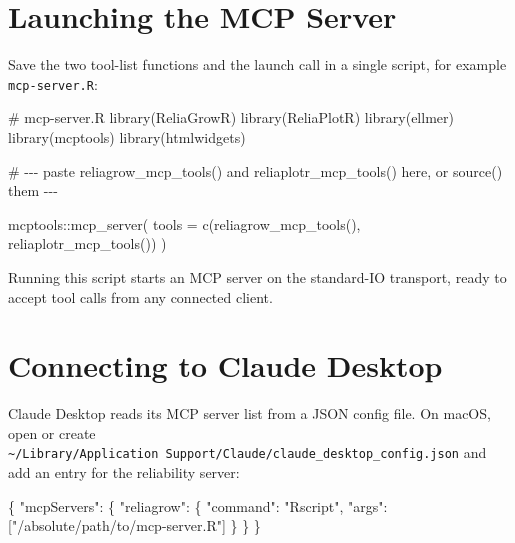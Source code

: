 \documentclass[
  letterpaper,
  DIV=11,
  numbers=noendperiod]{scrreprt}
\newenvironment{Shaded}{\begin{snugshade}}{\end{snugshade}}
\newcommand{\AttributeTok}[1]{\textcolor[rgb]{0.40,0.45,0.13}{#1}}
\newcommand{\CommentTok}[1]{\textcolor[rgb]{0.37,0.37,0.37}{#1}}
\newcommand{\DataTypeTok}[1]{\textcolor[rgb]{0.68,0.00,0.00}{#1}}
\newcommand{\FunctionTok}[1]{\textcolor[rgb]{0.28,0.35,0.67}{#1}}
\newcommand{\NormalTok}[1]{\textcolor[rgb]{0.00,0.23,0.31}{#1}}
\newcommand{\OtherTok}[1]{\textcolor[rgb]{0.00,0.23,0.31}{#1}}
\newcommand{\SpecialCharTok}[1]{\textcolor[rgb]{0.37,0.37,0.37}{#1}}
\newcommand{\StringTok}[1]{\textcolor[rgb]{0.13,0.47,0.30}{#1}}
\begin{document}
\section{Launching the MCP Server}\label{launching-the-mcp-server}

Save the two tool-list functions and the launch call in a single script,
for example \texttt{mcp-server.R}:

\begin{Shaded}
\begin{Highlighting}[]
\CommentTok{\# mcp{-}server.R}
\FunctionTok{library}\NormalTok{(ReliaGrowR)}
\FunctionTok{library}\NormalTok{(ReliaPlotR)}
\FunctionTok{library}\NormalTok{(ellmer)}
\FunctionTok{library}\NormalTok{(mcptools)}
\FunctionTok{library}\NormalTok{(htmlwidgets)}

\CommentTok{\# {-}{-}{-} paste reliagrow\_mcp\_tools() and reliaplotr\_mcp\_tools() here, or source() them {-}{-}{-}}

\NormalTok{mcptools}\SpecialCharTok{::}\FunctionTok{mcp\_server}\NormalTok{(}
  \AttributeTok{tools =} \FunctionTok{c}\NormalTok{(}\FunctionTok{reliagrow\_mcp\_tools}\NormalTok{(), }\FunctionTok{reliaplotr\_mcp\_tools}\NormalTok{())}
\NormalTok{)}
\end{Highlighting}
\end{Shaded}

Running this script starts an MCP server on the standard-IO transport,
ready to accept tool calls from any connected client.

\section{Connecting to Claude
Desktop}\label{connecting-to-claude-desktop}

Claude Desktop reads its MCP server list from a JSON config file. On
macOS, open or create
\texttt{\textasciitilde{}/Library/Application\ Support/Claude/claude\_desktop\_config.json}
and add an entry for the reliability server:

\begin{Shaded}
\begin{Highlighting}[]
\FunctionTok{\{}
  \DataTypeTok{"mcpServers"}\FunctionTok{:} \FunctionTok{\{}
    \DataTypeTok{"reliagrow"}\FunctionTok{:} \FunctionTok{\{}
      \DataTypeTok{"command"}\FunctionTok{:} \StringTok{"Rscript"}\FunctionTok{,}
      \DataTypeTok{"args"}\FunctionTok{:} \OtherTok{[}\StringTok{"/absolute/path/to/mcp{-}server.R"}\OtherTok{]}
    \FunctionTok{\}}
  \FunctionTok{\}}
\FunctionTok{\}}
\end{Highlighting}
\end{Shaded}
\end{document}
